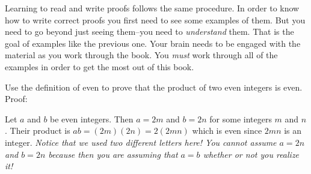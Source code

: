 Learning to read and write proofs follows the same procedure.  In order to know how to write 
correct proofs you first need to see some examples of them.  
But you need to go beyond just seeing them--you need to {\em understand} them.  That is the goal of
examples like the previous one.  Your brain needs to be engaged with the material as you work through
the book.  You {\em must} work through all of the examples in order to get the most out of this book.


\begin{exer}
Use the definition of even to prove that the product of two even integers is even.\\
Proof:\\
\vspace*{2.4in}
\begin{answer}
Let $a$ and $b$ be even integers.  Then $a=2m$ and $b=2n$ for some integers $m$ and $n$.
Their product is $ab=(2m)(2n)=2(2mn)$ which is even since $2mn$ is an integer. {\em Notice that we used two different letters here!
You cannot assume $a=2n$ and $b=2n$  because then you are
assuming that $a=b$ whether or not you realize it!}
\end{answer}
\end{exer}
%

